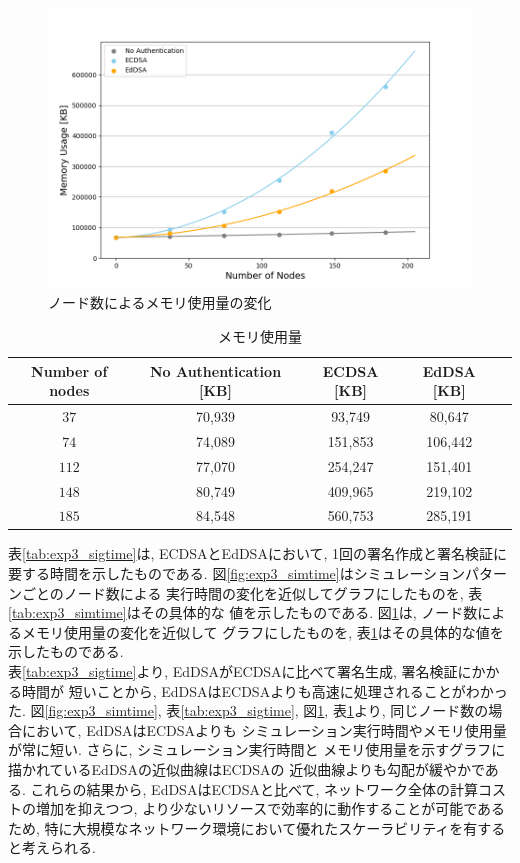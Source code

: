 \begin{figure}
  \centering
  \includegraphics[width=1\textwidth]{figures/exp3_memory.png}
  \caption{ノード数によるメモリ使用量の変化}
  \label{fig:memory_usages}
\end{figure}

\clearpage
\setlength{\tabcolsep}{4pt}
\begin{longtable}{c|cccc}
  \caption{メモリ使用量}
  \label{tab:exp3_memory} \\
  \endfirsthead
  \hline
  Number of nodes & No Authentication [KB] & ECDSA [KB] & EdDSA [KB] \\ \hline \hline
  $37$ & 70,939 & 93,749 & 80,647 \\
  $74$ & 74,089 & 151,853 & 106,442 \\
  $112$ & 77,070 & 254,247 & 151,401 \\
  $148$ & 80,749 & 409,965 & 219,102 \\
  $185$ & 84,548 & 560,753 & 285,191 \\ \hline
\end{longtable}




\indent 表\ref{tab:exp3_sigtime}は, ECDSAとEdDSAにおいて, 
1回の署名作成と署名検証に要する時間を示したものである.
図\ref{fig:exp3_simtime}はシミュレーションパターンごとのノード数による
実行時間の変化を近似してグラフにしたものを, 表\ref{tab:exp3_simtime}はその具体的な
値を示したものである. 図\ref{fig:memory_usages}は, ノード数によるメモリ使用量の変化を近似して
グラフにしたものを, 表\ref{tab:exp3_memory}はその具体的な値を示したものである. \\
\indent 表\ref{tab:exp3_sigtime}より, EdDSAがECDSAに比べて署名生成, 署名検証にかかる時間が
短いことから, EdDSAはECDSAよりも高速に処理されることがわかった. 
図\ref{fig:exp3_simtime}, 表\ref{tab:exp3_sigtime}, 図\ref{fig:memory_usages}, 
表\ref{tab:exp3_memory}より, 同じノード数の場合において, EdDSAはECDSAよりも
シミュレーション実行時間やメモリ使用量が常に短い. さらに, シミュレーション実行時間と
メモリ使用量を示すグラフに描かれているEdDSAの近似曲線はECDSAの
近似曲線よりも勾配が緩やかである. これらの結果から, EdDSAはECDSAと比べて, 
ネットワーク全体の計算コストの増加を抑えつつ, より少ないリソースで効率的に動作することが可能であるため, 
特に大規模なネットワーク環境において優れたスケーラビリティを有すると考えられる. \\



